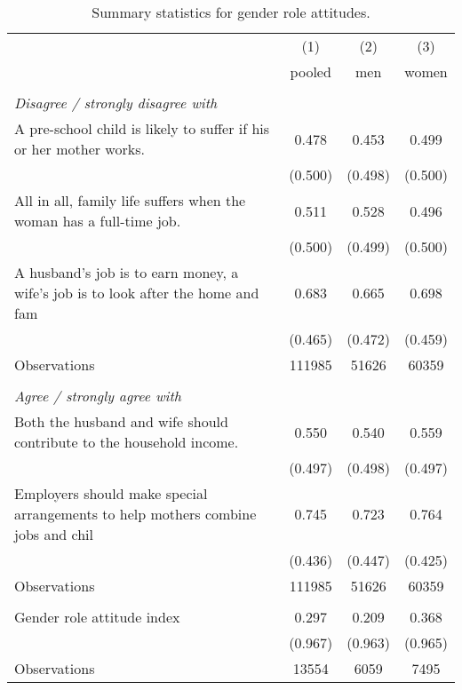 \begin{singlespace}
\begin{table}[h!]\centering\footnotesize
 \def\sym#1{\ifmmode^{#1}\else\(^{#1}\)\fi} 
\caption{Summary statistics for gender role attitudes.} 
\label{tab:sumgnorm} 
\begin{tabular}{l*{3}{c}} 
\hline\hline
                    &\multicolumn{1}{c}{(1)}&\multicolumn{1}{c}{(2)}&\multicolumn{1}{c}{(3)}\\
                    &\multicolumn{1}{c}{pooled}&\multicolumn{1}{c}{men}&\multicolumn{1}{c}{women}\\
\hline \\ \multicolumn{4}{l}{\textit{Disagree / strongly disagree with}} \\
A pre-school child is likely to suffer if his or her mother works.&       0.478         &       0.453         &       0.499         \\
                    &     (0.500)         &     (0.498)         &     (0.500)         \\
[1em]
All in all, family life suffers when the woman has a full-time job.&       0.511         &       0.528         &       0.496         \\
                    &     (0.500)         &     (0.499)         &     (0.500)         \\
[1em]
A husband's job is to earn money, a wife's job is to look after the home and fam&       0.683         &       0.665         &       0.698         \\
                    &     (0.465)         &     (0.472)         &     (0.459)         \\
\hline
Observations        &      111985         &       51626         &       60359         \\
\hline \\ \multicolumn{4}{l}{\textit{Agree / strongly agree with}} \\ 
Both the husband and wife should contribute to the household income.&       0.550         &       0.540         &       0.559         \\
                    &     (0.497)         &     (0.498)         &     (0.497)         \\
[1em]
Employers should make special arrangements to help mothers combine jobs and chil&       0.745         &       0.723         &       0.764         \\
                    &     (0.436)         &     (0.447)         &     (0.425)         \\
\hline
Observations        &      111985         &       51626         &       60359         \\
\hline \\  
Gender role attitude index&       0.297         &       0.209         &       0.368         \\
                    &     (0.967)         &     (0.963)         &     (0.965)         \\
\hline
Observations        &       13554         &        6059         &        7495         \\
\hline\hline 
\end{tabular} 
\end{table} 
\end{singlespace}
